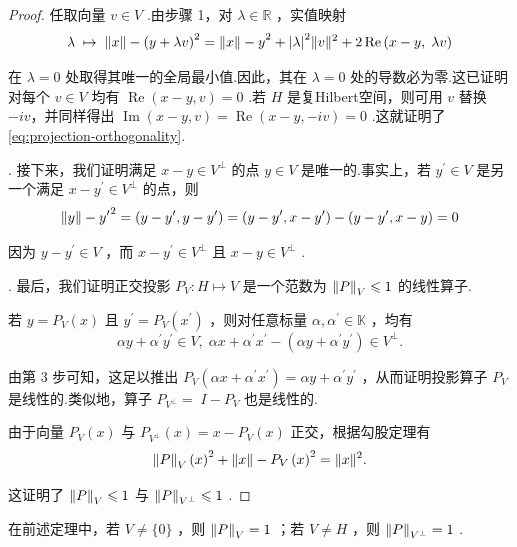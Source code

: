 \begin{proof}
任取向量 $v \in  V$ .由步骤 1，对 $\lambda  \in  \mathbb{R}$ ，实值映射
\[
\lambda \; \mapsto  \;{\norm{x} - \left( y + \lambda v\right) }^{2} = {\norm{x} - y}^{2} + {\left| \lambda \right| }^{2}\| v{\| }^{2} + 2\operatorname{Re}\left( {x - y,\;{\lambda v}}\right)
\]

在 $\lambda  = 0$ 处取得其唯一的全局最小值.因此，其在 $\lambda  = 0$ 处的导数必为零.这已证明对每个 $v \in  V$ 均有 $\operatorname{Re}\left( {x - y,v}\right)  = 0$ .若 $H$ 是复Hilbert空间，则可用 $v$ 替换 $- {iv}$，并同样得出 $\operatorname{Im}\left( {x - y,v}\right)  = \operatorname{Re}\left( {x - y, - {iv}}\right)  = 0$ .这就证明了\eqref{eq:projection-orthogonality}.

. 接下来，我们证明满足 $x - y \in  {V}^{ \bot  }$ 的点 $y \in  V$ 是唯一的.事实上，若 ${y}^{\prime } \in  V$ 是另一个满足 $x - {y}^{\prime } \in  {V}^{ \bot  }$ 的点，则
\[
{\norm{y} - {y}^{\prime }}^{2} = \left( {y - {y}^{\prime },y - {y}^{\prime }}\right)  = \left( {y - {y}^{\prime },x - {y}^{\prime }}\right)  - \left( {y - {y}^{\prime },x - y}\right)  = 0
\]

因为 $y - {y}^{\prime } \in  V$ ，而 $x - {y}^{\prime } \in  {V}^{ \bot  }$ 且 $x - y \in  {V}^{ \bot  }$ .

. 最后，我们证明正交投影 ${P}_{V} : H \mapsto  V$ 是一个范数为 $\norm{P}_{V} \leqslant  1$ 的线性算子.

若 $y = {P}_{V}\left( x\right)$ 且 ${y}^{\prime } = {P}_{V}\left( {x}^{\prime }\right)$ ，则对任意标量 $\alpha ,{\alpha }^{\prime } \in  \mathbb{K}$ ，均有
\[
{\alpha y} + {\alpha }^{\prime }{y}^{\prime } \in  V,\;{\alpha x} + {\alpha }^{\prime }{x}^{\prime } - \left( {{\alpha y} + {\alpha }^{\prime }{y}^{\prime }}\right)  \in  {V}^{ \bot  }.
\]

由第 3 步可知，这足以推出 ${P}_{V}\left( {{\alpha x} + {\alpha }^{\prime }{x}^{\prime }}\right)  = {\alpha y} + {\alpha }^{\prime }{y}^{\prime }$ ，从而证明投影算子 ${P}_{V}$ 是线性的.类似地，算子 ${P}_{{V}^{ \bot  }} = \; I - {P}_{V}$ 也是线性的.

由于向量 ${P}_{V}\left( x\right)$ 与 ${P}_{{V}^{ \bot  }}\left( x\right)  = x - {P}_{V}\left( x\right)$ 正交，根据勾股定理有
\[
{\norm{P}_{V}\left( x\right) }^{2} + {\norm{x} - {P}_{V}\left( x\right) }^{2} = \| x{\| }^{2}.
\]

这证明了 $\norm{P}_{V} \leqslant  1$ 与 $\norm{P}_{{V}^{ \bot  }} \leqslant  1$ .
\end{proof}

\begin{remark}\label{rem:projection-norm}
在前述定理中，若 $V \neq  \{ 0\}$ ，则 $\norm{P}_{V} = 1$ ；若 $V \neq  H$ ，则 $\norm{P}_{{V}^{ \bot  }} = 1$ .
\end{remark}

